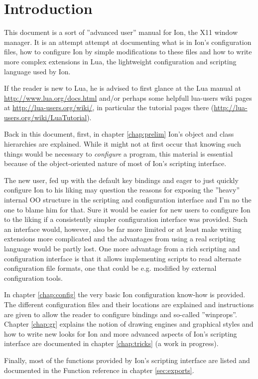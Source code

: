 
\chapter{Introduction}

This document is a sort of ''advanced user'' manual for Ion, the X11
window manager. It is an attempt attempt at documenting what is in Ion's
configuration files, how to configure Ion by simple modifications to these
files and how to write more complex extensions in Lua, the lightweight
configuration and scripting language used by Ion. 

If the reader is new to Lua, he is advised to first glance at the Lua
manual at \url{http://www.lua.org/docs.html} and/or perhaps some helpfull
lua-users wiki pages at \url{http://lua-users.org/wiki/}, in particular 
the tutorial pages there (\url{http://lua-users.org/wiki/LuaTutorial}).

Back in this document, first, in chapter \ref{chap:prelim} Ion's object 
and class hierarchies are explained. While it might not at first occur 
that knowing such things would be necessary to \emph{configure} a program,
this material is essential because of the object-oriented nature of most 
of Ion's scripting interface.

The new user, fed up with the default key bindings and eager to just
quickly configure Ion to his liking may question the reasons for 
exposing the ''heavy'' internal OO structure in the scripting and
configuration interface and I'm no the one to  blame him for that. 
Sure it would be easier for new users to  configure Ion to the liking
if a consistently simpler configuration interface was provided. Such an
interface would, however, also be far more limited or at least make 
writing extensions more complicated and the advantages from using a 
real scripting language would be partly lost. One more advantage from
a rich scripting and configuration interface is that it allows 
implementing scripts to read alternate configuration file formats,
one that could be e.g. modified by external configuration tools. 

In chapter \ref{chap:config} the very basic Ion configuration know-how
is provided. The different configuration files and their locations
are explained and instructions are given to allow the reader to
configure bindings and so-called ''winprops''.  Chapter \ref{chap:gr}
explains the notion of drawing engines and graphical styles and how to
write new looks for Ion and more advanced aspects of Ion's scripting 
interface are documented in chapter \ref{chap:tricks} (a work in 
progress).

Finally, most of the functions provided by Ion's scripting interface
are listed and documented in the Function reference in 
chapter \ref{sec:exports}.


